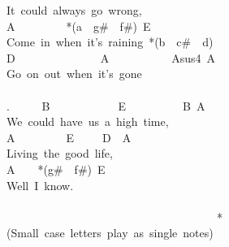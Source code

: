 {It\ could\ always\ go\ wrong,\\
A\ \ \ \ \ \ \ \ \ *(a\ \ g\#\ \ f\#)\ E\ \ \ \ \ \ \\
Come\ in\ when\ it's\ raining\ *(b\ \ c\#\ \ d)\\
D\ \ \ \ \ \ \ \ \ \ \ \ \ \ \ A\ \ \ \ \ \ \ \ \ \ \ Asus4\ A\\
Go\ on\ out\ when\ it's\ gone\\
\\
. \ \ \ \ \ B\ \ \ \ \ \ \ \ \ \ \ \ E\ \ \ \ \ \ \ \ \ \ B\ A\ \\
We\ could\ have\ us\ a\ high\ time,\\
A\ \ \ \ \ \ \ \ \ E\ \ \ \ \ D\ \ A\\
Living\ the\ good\ life,\\
A\ \ \ \ *(g\#\ \ f\#)\ E\ \ \ \ \ \ \ \ \ \\
Well\ I\ know.\\
\\
\ \ \ \ \ \ \ \ \ \ \ \ \ \ \ \ \ \ \ \ \ \ \ \ \ \ \ \ \ \ \ \ \ \ \ \ \ *(Small\ case\ letters\ play\ as\ single\ notes)\ }
